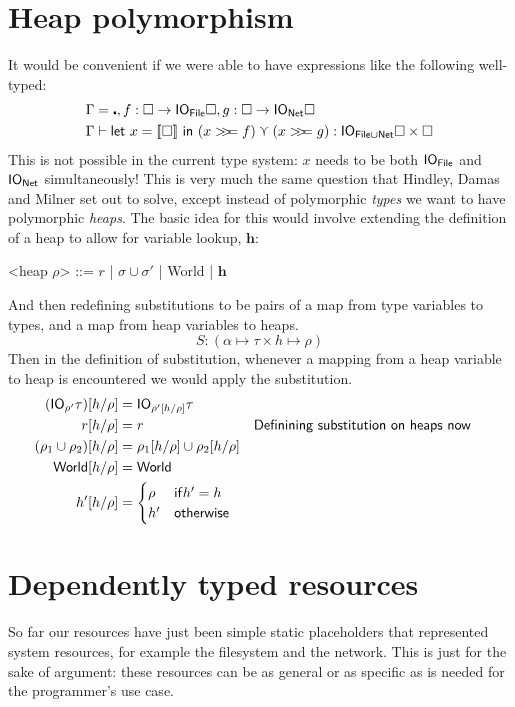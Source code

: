 \section{Heap polymorphism}
It would be convenient if we were able to have expressions like the
following well-typed:
\begin{align*}
\Gamma &= \centerdot , f : \square \rightarrow \IO_{\textsf{File}} \square, g : \square \rightarrow \IO_{\textsf{Net}} \square \\
\Gamma &\vdash \letin{x = \llbracket \square \rrbracket}{(x \bind f) \curlyvee (x \bind g)} : \IO_{\textsf{File} \cup
  \textsf{Net}} \square \times \square
\end{align*}
This is not possible in the current type system: $x$ needs to be both
$\mathsf{IO}_{\textsf{File}}$ and $\mathsf{IO}_{\textsf{Net}}$ simultaneously! This is
very much the same question that Hindley, Damas and Milner set out to
solve, except instead of polymorphic \textit{types} we want to have
polymorphic \textit{heaps}.
The basic idea for this would involve extending the definition of a
heap to allow for variable lookup, $\textbf{h}$:
\begin{grammar}
  <heap $\rho$> ::= $r$ | $\sigma \cup \sigma'$ | \textsf{World} | $\mathbf{h}$
\end{grammar}
And then redefining substitutions to be pairs of a map from
type variables to types, and a map from heap variables to heaps.
\[ S : ( \alpha \mapsto \tau \times h \mapsto \rho ) \]
Then in the definition of substitution, whenever a mapping from a heap
variable to heap is encountered we would apply the substitution.
\begin{align*}
  (\mathsf{IO}_{\rho'} \tau)[h/\rho] &= \mathsf{IO}_{\rho'[h/\rho]} \tau \\
  r[h/\rho] &= r  && \textsf{Definining substitution on heaps now} \\
  (\rho_1 \cup \rho_2)[h/\rho] &= \rho_1[h/\rho] \cup \rho_2[h/\rho] \\
  \textsf{World}[h/\rho] &= \textsf{World} \\
  h'[h/\rho] &=
            \begin{cases}
              \rho & \mathsf{if} h' = h \\
              h' & \mathsf{otherwise}
            \end{cases}
\end{align*}

\section{Dependently typed resources}
So far our resources have just been simple static placeholders that
represented system resources, for example the filesystem and the
network. This is just for the sake of argument: these resources can be
as general or as specific as is needed for the programmer's use
case.

